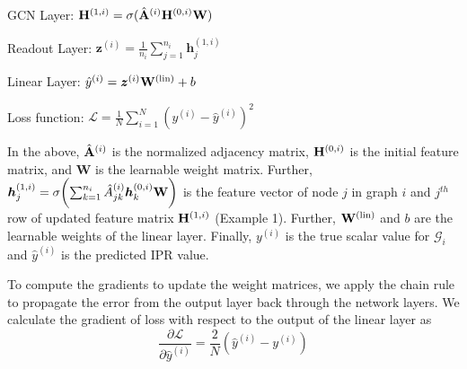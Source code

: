 \documentclass[aps, prd, showpacs, floatfix, superscriptaddress, twocolumn, nofootinbib, preprintnumbers, longbibliography]{revtex4-2}
\begin{document}
\vspace{2mm}
\noindent GCN Layer: ${\bf H}^{(1,i)} = \sigma(\hat{\bf A}^{(i)} {\bf H}^{(0,i)} {\bf W})$

\vspace{2mm}
\noindent Readout Layer: $\bm{z}^{(i)} = \frac{1}{n_i}\sum_{j=1}^{n_i} \bm{h}^{(1,i)}_j$

\vspace{2mm}
\noindent Linear Layer: $\hat{y}^{(i)} = \bm{z}^{(i)} {\bf W}^{(\text{lin})} + b$   

\vspace{2mm}
\noindent Loss function: $\mathcal{L} = \frac{1}{N} \sum_{i=1}^N (y^{(i)} - \hat{y}^{(i)})^2$

In the above, $\hat{\bf A}^{(i)}$ is the normalized adjacency matrix, ${\bf H}^{(0, i)}$ is the initial feature matrix, and {\bf W} is the learnable weight matrix. Further, $\bm{h}^{(1,i)}_j=\sigma\biggl(\sum_{k=1}^{n_i} \hat{A}^{(i)}_{jk} \bm{h}^{(0,i)}_k {\bf W}\biggr)$ is the feature vector of node $j$ in graph $i$ and $j^{th}$ row of updated feature matrix ${\bf H}^{(1,i)}$ (Example 1). Further, ${\bf W}^{(\text{lin})}$ and $b$ are the learnable weights of the linear layer. Finally, $y^{(i)}$ is the true scalar value for $\mathcal{G}_i$ and $\hat{y}^{(i)}$ is the predicted IPR value.

\vspace{2mm}
To compute the gradients to update the weight matrices, we apply the chain rule to propagate the error from the output layer back through the network layers. We calculate the gradient of loss with respect to the output of the linear layer as
\begin{equation}
\frac{\partial \mathcal{L}}{\partial \hat{y}^{(i)}} = \frac{2}{N} (\hat{y}^{(i)} - y^{(i)})    
\end{equation}
\end{document}
